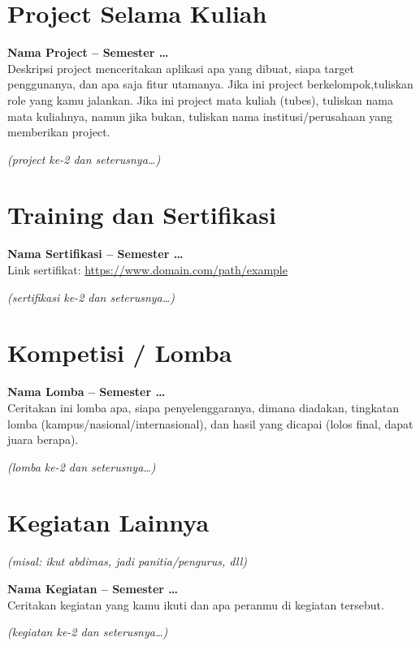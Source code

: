 \documentclass[a4paper,11pt]{article}
\begin{document}
\section*{Project Selama Kuliah}

\textbf{Nama Project -- Semester \ldots}\\
Deskripsi project menceritakan aplikasi apa yang dibuat, siapa target penggunanya,
dan apa saja fitur utamanya. Jika ini project berkelompok,tuliskan role yang kamu jalankan. Jika ini project mata kuliah (tubes), tuliskan nama mata
kuliahnya, namun jika bukan, tuliskan nama institusi/perusahaan yang memberikan
project.

\textit{(project ke-2 dan seterusnya\ldots)}

\section*{Training dan Sertifikasi}

\textbf{Nama Sertifikasi -- Semester \ldots}\\
Link sertifikat: \url{https://www.domain.com/path/example}

\textit{(sertifikasi ke-2 dan seterusnya\ldots)}

\section*{Kompetisi / Lomba}

\textbf{Nama Lomba -- Semester \ldots}\\
Ceritakan ini lomba apa, siapa penyelenggaranya, dimana diadakan, tingkatan
lomba (kampus/nasional/internasional), dan hasil yang dicapai (lolos final,
dapat juara berapa).

\textit{(lomba ke-2 dan seterusnya\ldots)}

\section*{Kegiatan Lainnya}
\textit{(misal: ikut abdimas, jadi panitia/pengurus, dll)}

\textbf{Nama Kegiatan -- Semester \ldots}\\
Ceritakan kegiatan yang kamu ikuti dan apa peranmu di kegiatan tersebut.

\textit{(kegiatan ke-2 dan seterusnya\ldots)}

\vspace{12pt}
\noindent{}
\end{document}
